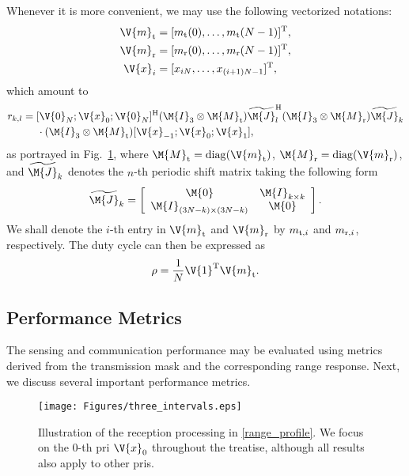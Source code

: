 \documentclass[journal,a4paper,10pt, romanappendices]{IEEEtran}
\begin{document}
Whenever it is more convenient, we may use the following vectorized notations:
\begin{subequations}
\begin{align}
\V{m}_{\rm t}&=[m_{\rm t}(0),\dotsc,m_{\rm t}(N-1)]^{\rm T},\\
\V{m}_{\rm r}&=[m_{\rm r}(0),\dotsc,m_{\rm r}(N-1)]^{\rm T}, \\
\V{x}_i &= [x_{iN},\dotsc,x_{(i+1)N-1}]^{\rm T},
\end{align}
\end{subequations}
which amount to
\begin{align}\label{range_profile}
r_{k,l} &= [\V{0}_N;\V{x}_0;\V{0}_N]^{\rm H}(\M{I}_3\otimes \M{M}_{\rm t})\widetilde{\M{J}}_l^{\rm H} (\M{I}_3\otimes \M{M}_{\rm r})\widetilde{\M{J}}_k\nonumber\\
&\hspace{5mm}\cdot(\M{I}_3\otimes\M{M}_{\rm t}) [\V{x}_{-1};\V{x}_0;\V{x}_1],
\end{align}
as portrayed in Fig.~\ref{fig:three_intervals}, where $\M{M}_{\rm t}={\rm diag}(\V{m}_{\rm t})$, $\M{M}_{\rm r}={\rm diag}(\V{m}_{\rm r})$, and $\widetilde{\M{J}}_k$ denotes the $n$-th periodic shift matrix taking the following form
\begin{equation}
    \widetilde{\M{J}}_k = \left[ {\begin{array}{*{20}{c}}
  {\M{0}}& {\M{I}_{k\times k}}\\ 
  {{\M{I}_{(3N-k)\times (3N-k)}}}&{\M{0}} 
\end{array}} \right].
\end{equation}
We shall denote the $i$-th entry in $\V{m}_{\rm t}$ and $\V{m}_{\rm r}$ by $m_{{\rm t},i}$ and $m_{{\rm r},i}$, respectively. The duty cycle can then be expressed as 
\begin{equation}\label{dc}
\rho = \frac{1}{N}\V{1}^{\rm T} \V{m}_{\rm t}.
\end{equation}
\subsection{Performance Metrics}\label{ssec:metric}
The sensing and communication performance may be evaluated using metrics derived from the transmission mask and the corresponding range response. Next, we discuss several important performance metrics.

\begin{figure}[t]
    \centering
    \texttt{[image: Figures/three\_intervals.eps]}
    \caption{Illustration of the reception processing in \eqref{range_profile}. We focus on the $0$-th \ac{pri} $\V{x}_0$ throughout the treatise, although all results also apply to other \ac{pri}s.}
    \label{fig:three_intervals}
    \vspace{-4mm}
\end{figure}
\end{document}
